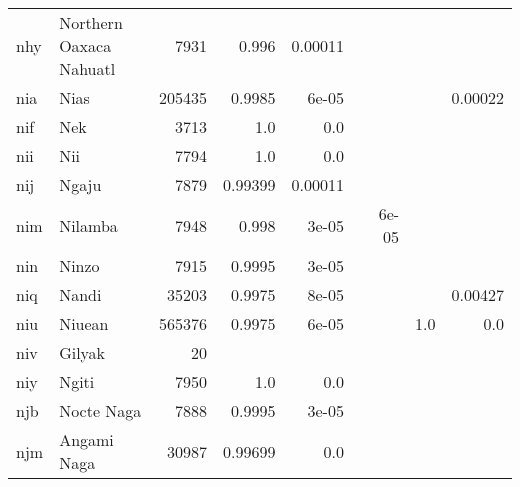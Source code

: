 \documentclass[11pt]{article}
\begin{document}
\begin{table*}[h]
{\begin{tabular}{llrrrrrrr}
nhy         & Northern Oaxaca Nahuatl         & 7931         & 0.996         & 0.00011         &          &          &          &          \\

nia         & Nias         & 205435         & 0.9985         & 6e-05         &          &          &          & 0.00022         \\

nif         & Nek         & 3713         & 1.0         & 0.0         &          &          &          &          \\

nii         & Nii         & 7794         & 1.0         & 0.0         &          &          &          &          \\

nij         & Ngaju         & 7879         & 0.99399         & 0.00011         &          &          &          &          \\

nim         & Nilamba         & 7948         & 0.998         & 3e-05         &          & 6e-05         &          &          \\

nin         & Ninzo         & 7915         & 0.9995         & 3e-05         &          &          &          &          \\

niq         & Nandi         & 35203         & 0.9975         & 8e-05         &          &          &          & 0.00427         \\

niu         & Niuean         & 565376         & 0.9975         & 6e-05         &          &          & 1.0         & 0.0         \\

niv         & Gilyak         & 20         &          &          &          &          &          &          \\

niy         & Ngiti         & 7950         & 1.0         & 0.0         &          &          &          &          \\

njb         & Nocte Naga         & 7888         & 0.9995         & 3e-05         &          &          &          &          \\

njm         & Angami Naga         & 30987         & 0.99699         & 0.0         &          &          &          &          \\


\end{tabular}}
\end{table*}
\end{document}
